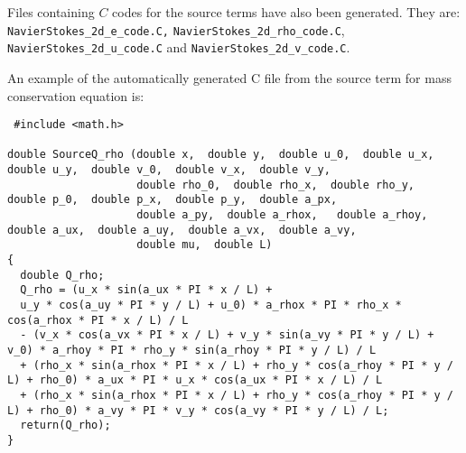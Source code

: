 \documentclass[10pt]{article}
\begin{document}
\begin{landscape}
Files containing  $C$ codes for the source terms have also been generated. They are: \texttt{NavierStokes\_2d\_e\_code.C,} \texttt{NavierStokes\_2d\_rho\_code.C}, \texttt{NavierStokes\_2d\_u\_code.C} and  \texttt{NavierStokes\_2d\_v\_code.C}.

An example of the automatically generated C file from the source term for mass conservation equation is:

\begin{verbatim}
 #include <math.h>

double SourceQ_rho (double x,  double y,  double u_0,  double u_x,  double u_y,  double v_0,  double v_x,  double v_y,
                    double rho_0,  double rho_x,  double rho_y,  double p_0,  double p_x,  double p_y,  double a_px,
                    double a_py,  double a_rhox,   double a_rhoy,  double a_ux,  double a_uy,  double a_vx,  double a_vy,
                    double mu,  double L)
{
  double Q_rho;
  Q_rho = (u_x * sin(a_ux * PI * x / L) +
  u_y * cos(a_uy * PI * y / L) + u_0) * a_rhox * PI * rho_x * cos(a_rhox * PI * x / L) / L
  - (v_x * cos(a_vx * PI * x / L) + v_y * sin(a_vy * PI * y / L) +  v_0) * a_rhoy * PI * rho_y * sin(a_rhoy * PI * y / L) / L
  + (rho_x * sin(a_rhox * PI * x / L) + rho_y * cos(a_rhoy * PI * y / L) + rho_0) * a_ux * PI * u_x * cos(a_ux * PI * x / L) / L
  + (rho_x * sin(a_rhox * PI * x / L) + rho_y * cos(a_rhoy * PI * y / L) + rho_0) * a_vy * PI * v_y * cos(a_vy * PI * y / L) / L;
  return(Q_rho);
}
\end{verbatim}



\end{landscape}
\end{document}
